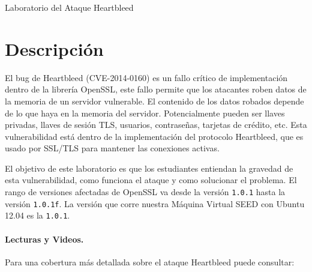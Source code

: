 
\newcommand{\commonfolder}{../../common-files}





\newcommand{\heartFigs}{./Figs}




\begin{center}
{\LARGE Laboratorio del Ataque Heartbleed}
\end{center}




\section{Descripción}

El bug de Heartbleed (CVE-2014-0160) es un fallo crítico de implementación dentro de la librería OpenSSL, este fallo permite que los atacantes roben datos de la memoria de un servidor vulnerable. El contenido de los datos robados depende de lo que haya en la memoria del servidor. Potencialmente pueden ser llaves privadas, llaves de sesión TLS, usuarios, contraseñas, tarjetas de crédito, etc. Esta vulnerabilidad está dentro de la implementación del protocolo Heartbleed, que es usado por SSL/TLS para mantener las conexiones activas.

El objetivo de este laboratorio es que los estudiantes entiendan la gravedad de esta vulnerabilidad, como funciona el ataque y como solucionar el problema. El rango de versiones afectadas de OpenSSL va desde la versión {\tt 1.0.1} hasta la versión {\tt 1.0.1f}. La versión que corre nuestra Máquina Virtual SEED con Ubuntu 12.04 es la {\tt 1.0.1}. 


\paragraph{Lecturas y Videos.}
Para una cobertura más detallada sobre el ataque Heartbleed puede consultar:

